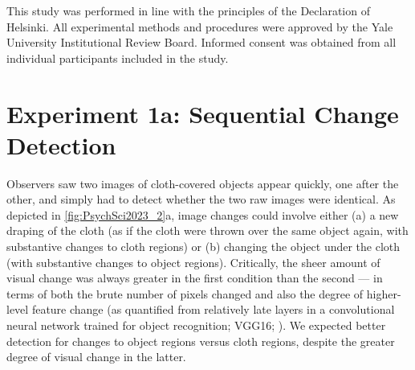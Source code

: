 This study was performed in line with the principles of the Declaration of Helsinki. All experimental methods and procedures were approved by the Yale University Institutional Review Board. Informed consent was obtained from all individual participants included in the study.

\section{Experiment 1a: Sequential Change Detection}

Observers saw two images of cloth-covered objects appear quickly, one after the other, and simply had to detect whether the two raw images were identical. As depicted in \cref{fig:PsychSci2023_2}a, image changes could involve either (a) a new draping of the cloth (as if the cloth were thrown over the same object again, with substantive changes to cloth regions) or (b) changing the object under the cloth (with substantive changes to object regions). Critically, the sheer amount of visual change was always greater in the first condition than the second --- in terms of both the brute number of pixels changed and also the degree of higher-level feature change (as quantified from relatively late layers in a convolutional neural network trained for object recognition; VGG16; \cite{simonyan_very_2015}). We expected better detection for changes to object regions versus cloth regions, despite the greater degree of visual change in the latter.

